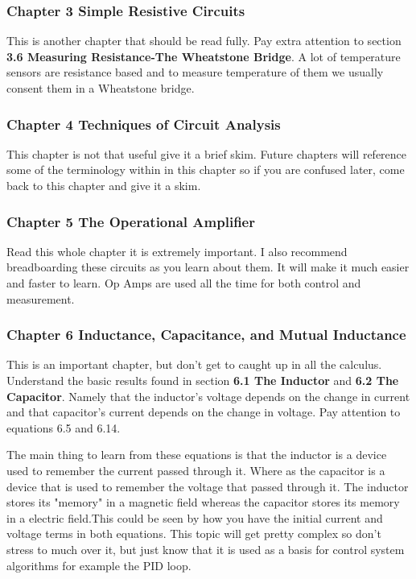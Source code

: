 \documentclass[11pt]{article}
\begin{document}
\subsubsection{Chapter 3 Simple Resistive Circuits}
\label{sec:org8d18e11}
This is another chapter that should be read fully. Pay extra attention to section
\textbf{3.6 Measuring Resistance-The Wheatstone Bridge}. A lot of temperature sensors are resistance based
and to measure temperature of them we usually consent them in a Wheatstone bridge.
\subsubsection{Chapter 4 Techniques of Circuit Analysis}
\label{sec:orgfd7d4bd}
This chapter is not that useful give it a brief skim. Future chapters will reference some of the
terminology within in this chapter so if you are confused later, come back to this chapter and give
it a skim.
\subsubsection{Chapter 5 The Operational Amplifier}
\label{sec:orgcc87d87}
Read this whole chapter it is extremely important. I also recommend breadboarding these circuits as
you learn about them. It will make it much easier and faster to learn. Op Amps are used all the time
for both control and measurement.
\subsubsection{Chapter 6 Inductance, Capacitance, and Mutual Inductance}
\label{sec:org6590112}
This is an important chapter, but don't get to caught up in all the calculus. Understand the basic
results found in section \textbf{6.1 The Inductor} and \textbf{6.2 The Capacitor}. Namely that the inductor's
voltage depends on the change in current and that capacitor's current depends on the change in
voltage. Pay attention to equations 6.5 and 6.14.

The main thing to learn from these equations is that the inductor is a device used to remember the
current passed through it. Where as the capacitor is a device that is used to remember the voltage
that passed through it. The inductor stores its "memory" in a magnetic field whereas the capacitor
stores its memory in a electric field.This could be seen by how you have the initial current and
voltage terms in both equations. This topic will get pretty complex so don't stress to much over it,
but just know that it is used as a basis for control system algorithms for example the PID loop.
\end{document}
